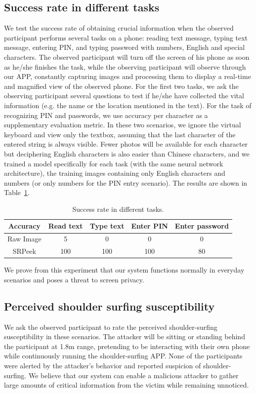 \subsection{Success rate in different tasks}
We test the success rate of obtaining crucial information when the observed participant performs several tasks on a phone: reading text message, typing text message, entering PIN, and typing password with numbers, English and special characters. The observed participant will turn off the screen of his phone as soon as he/she finishes the task, while the observing participant will observe through our APP, constantly capturing images and processing them to display a real-time and magnified view of the observed phone. For the first two tasks, we ask the observing participant several questions to test if he/she have collected the vital information (e.g. the name or the location mentioned in the text). For the task of recognizing PIN and passwords, we use accuracy per character as a supplementary evaluation metric. In these two scenarios, we ignore the virtual keyboard and view only the textbox, assuming that the last character of the entered string is always visible. Fewer photos will be available for each character but deciphering English characters is also easier than Chinese characters, and we trained a model specifically for each task (with the same neural network architecture), the training images containing only English characters and numbers (or only numbers for the PIN entry scenario). The results are shown in Table~\ref{table-task}.

\begin{table}[!t]
\centering
\caption{Success rate in different tasks.}
\label{table-task}
\begin{tabular}{@{}ccccc@{}}
	\toprule
Accuracy & Read text & Type text & Enter PIN & Enter password\\ \midrule
Raw Image & 5 & 0 & 0 & 0\\
SRPeek & 100 & 100 & 100 & 80\\ \bottomrule
\end{tabular}

\end{table}

We prove from this experiment that our system functions normally in everyday scenarios and poses a threat to screen privacy.

\subsection{Perceived shoulder surfing susceptibility}
We ask the observed participant to rate the perceived shoulder-surfing susceptibility in these scenarios. The attacker will be sitting or standing behind the participant at 1.8m range, pretending to be interacting with their own phone while continuously running the shoulder-surfing APP. None of the participants were alerted by the attacker's behavior and reported suspicion of shoulder-surfing. We believe that our system can enable a malicious attacker to gather large amounts of critical information from the victim while remaining unnoticed.




